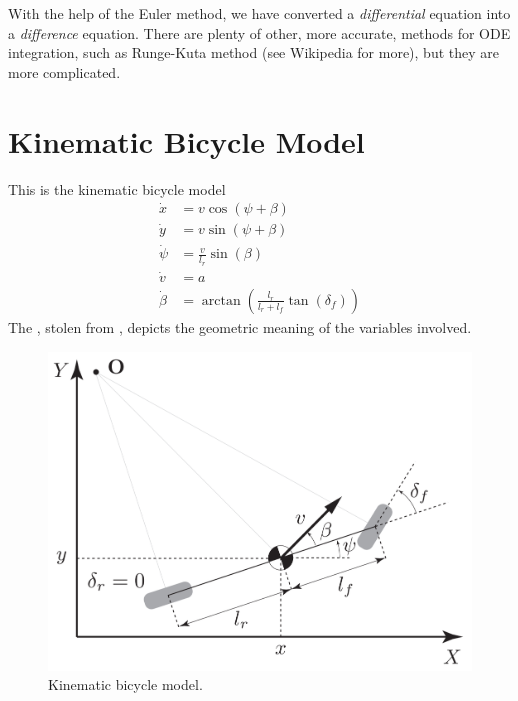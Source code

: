 \documentclass[a4paper]{article}
\begin{document}
With the help of the Euler method, we have converted a \emph{differential} equation into a \emph{difference} equation.
There are plenty of other, more accurate, methods for ODE integration, such as Runge-Kuta method (see Wikipedia for more), but they are more complicated.



\section{Kinematic Bicycle Model}\label{sec:kinematic_bicycle_model}
This is the kinematic bicycle model
\begin{align}\label{eq:kinematic_bicycle_model_continuous}
	\dot{x} 	&=  v \cos(\psi + \beta) \\
	\dot{y} 	&=  v \sin(\psi + \beta) \\
	\dot{\psi} 	&=  \frac{v}{l_r} \sin(\beta) \\
	\dot{v} 	&=  a \\
	\dot{\beta} &= \arctan\left(\frac{l_r}{l_r + l_f}\tan(\delta_f)\right)
\end{align}
The , stolen from \cite{Kong2015}, depicts the geometric meaning of the variables involved.
\begin{figure}[h]
	\centering
	\includegraphics[scale=0.2]{./img/kinematic_bicycle_model.png}
	\caption{Kinematic bicycle model.}
	\label{fig:kinematic_bicycle_model}
\end{figure}
\end{document}
